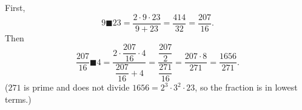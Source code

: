 First,
\[9\blacksquare23=\dfrac{2\cdot9\cdot23}{9+23}=\dfrac{414}{32}=\dfrac{207}{16}.\]
Then
\[\dfrac{207}{16}\blacksquare4=\dfrac{2\cdot\dfrac{207}{16}\cdot4}{\dfrac{207}{16}+4}=\dfrac{\dfrac{207}{2}}{\dfrac{271}{16}}=\dfrac{207\cdot8}{271}=\boxed{\dfrac{1656}{271}}.\]
($271$ is prime and does not divide $1656=2^3\cdot3^2\cdot23$, so the fraction is in lowest terms.)
